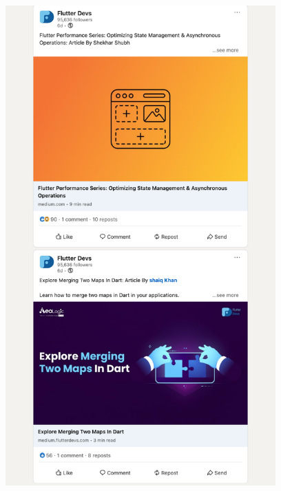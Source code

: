 \Continuing
\begin{center}
    \includegraphics[width=28em]{flutter-devs-posts-p4}
\end{center}
\WillContinue
\pagebreak

